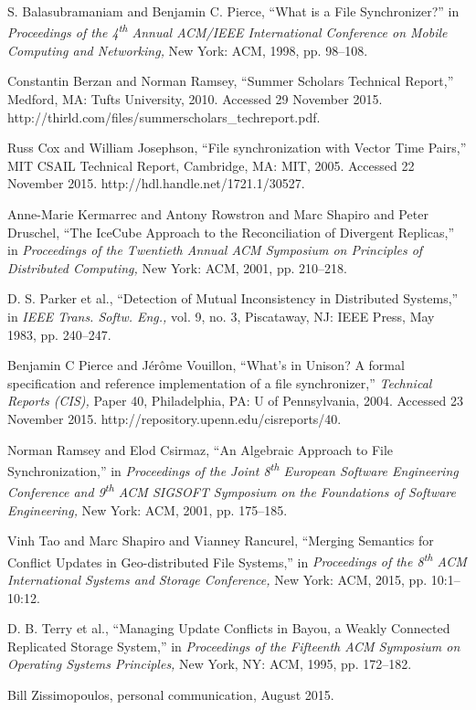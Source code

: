 
S. Balasubramaniam and Benjamin C. Pierce,
``What is a File Synchronizer?''
in \emph{Proceedings of the 4\textsuperscript{th} Annual 
ACM/IEEE International Conference on Mobile Computing and Networking,}
New York: ACM, 1998, pp. 98--108.

Constantin Berzan and Norman Ramsey,
``Summer Scholars Technical Report,''
Medford, MA: Tufts University, 2010.
Accessed 29 November 2015.
http://thirld.com/files/summerscholars\_techreport.pdf.

Russ Cox and William Josephson,
``File synchronization with Vector Time Pairs,''
MIT CSAIL Technical Report,
Cambridge, MA: MIT,
2005.
Accessed 22 November 2015.
http://hdl.handle.net/1721.1/30527.

Anne-Marie Kermarrec and Antony Rowstron and Marc Shapiro and Peter Druschel,
``The IceCube Approach to the Reconciliation of Divergent Replicas,''
in \emph{Proceedings of the Twentieth Annual ACM Symposium on Principles of Distributed Computing,}
New York: ACM, 2001, pp. 210--218.

D. S. Parker et al.,
``Detection of Mutual Inconsistency in Distributed Systems,''
in \emph{IEEE Trans. Softw. Eng.,}
vol. 9, no. 3,
Piscataway, NJ: IEEE Press,
May 1983,
pp. 240--247.

Benjamin C Pierce and J{\'e}r{\^o}me Vouillon,
``What's in Unison? A formal specification and reference implementation of a file synchronizer,''
\emph{Technical Reports (CIS),}
Paper 40,
Philadelphia, PA: U of Pennsylvania,
2004.
Accessed 23 November 2015.
http://repository.upenn.edu/cis\texttt{\detokenize{_}}reports/40.

Norman Ramsey and Elod Csirmaz,
``An Algebraic Approach to File Synchronization,''
in \emph{Proceedings of the Joint 8\textsuperscript{th} European Software Engineering Conference 
and 9\textsuperscript{th} ACM SIGSOFT Symposium on the Foundations of Software Engineering,}
New York: ACM, 2001, pp. 175--185.

Vinh Tao and Marc Shapiro and Vianney Rancurel,
``Merging Semantics for Conflict Updates in Geo-distributed File Systems,''
in \emph{Proceedings of the 8\textsuperscript{th}
 ACM International Systems and Storage Conference,}
New York: ACM, 2015, pp. 10:1--10:12.

D. B. Terry et al.,
``Managing Update Conflicts in Bayou, a Weakly Connected Replicated Storage System,''
in \emph{Proceedings of the Fifteenth ACM Symposium on Operating Systems Principles,}
New York, NY: ACM, 1995, pp. 172--182.

Bill Zissimopoulos, personal communication, August 2015.

